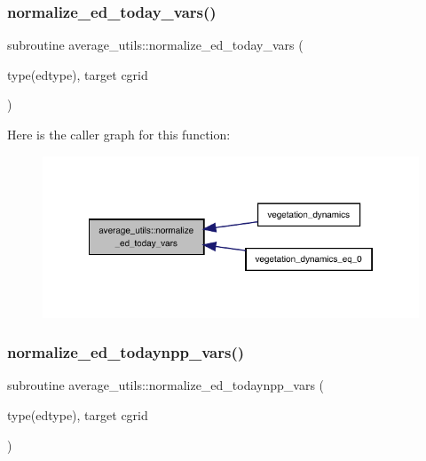 \subsubsection{\texorpdfstring{normalize\+\_\+ed\+\_\+today\+\_\+vars()}{normalize\_ed\_today\_vars()}}
{\footnotesize\ttfamily subroutine average\+\_\+utils\+::normalize\+\_\+ed\+\_\+today\+\_\+vars (\begin{DoxyParamCaption}\item[{type(edtype), target}]{cgrid }\end{DoxyParamCaption})}

Here is the caller graph for this function\+:
\nopagebreak
\begin{figure}[H]
\begin{center}
\leavevmode
\includegraphics[width=322pt]{namespaceaverage__utils_a538e2e59c7c2889ae624b6e1d2a9e5f2_icgraph}
\end{center}
\end{figure}
\mbox{\label{namespaceaverage__utils_a446f9090fbbcf3eb12f4b9231d946e89}} 
\subsubsection{\texorpdfstring{normalize\+\_\+ed\+\_\+todaynpp\+\_\+vars()}{normalize\_ed\_todaynpp\_vars()}}
{\footnotesize\ttfamily subroutine average\+\_\+utils\+::normalize\+\_\+ed\+\_\+todaynpp\+\_\+vars (\begin{DoxyParamCaption}\item[{type(edtype), target}]{cgrid }\end{DoxyParamCaption})}

\mbox{\label{namespaceaverage__utils_a81384775dd05dba144bf83e9731d5275}} 

